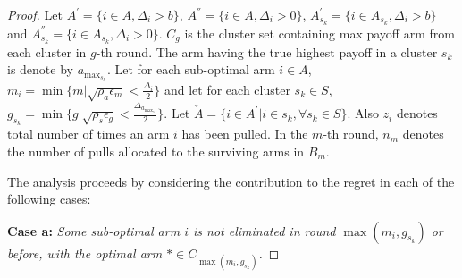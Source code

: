 \begin{proof}

Let $A^{'}=\lbrace i \in A,\Delta_{i}> b\rbrace$,  $A^{''}=\lbrace i \in A, \Delta_{i} > 0\rbrace$, $A^{'}_{s_{k}}=\lbrace i \in A_{s_{k}},\Delta_{i}> b\rbrace$ and $A^{''}_{s_{k}}=\lbrace i \in A_{s_{k}}, \Delta_{i} > 0 \rbrace$. $C_{g}$ is the cluster set containing max payoff arm from each cluster in $g$-th round. The arm having the true highest payoff in a cluster $s_{k}$ is denote by $a_{\max_{s_{k}}}$. Let for each sub-optimal arm ${i}\in A$, $m_{i}=\min{\lbrace m|\sqrt{\rho_{a}\epsilon_{m}} < \frac{\Delta_{i}}{2} \rbrace}$ and let for each cluster $s_{k}\in S$, $g_{s_{k}}=\min{\lbrace g|\sqrt{\rho_{s}\epsilon_{g}} < \frac{\Delta_{a_{\max_{s_{k}}}}}{2} \rbrace}$. 
Let $\check{A}=\lbrace {i}\in A^{'} | {i}\in s_{k} , \forall s_{k}\in S \rbrace$. Also $z_{i}$ denotes total number of times an arm $i$ has been pulled. In the $m$-th round, $n_{m}$ denotes the number of pulls allocated to the surviving arms in $B_{m}$. 

The analysis proceeds by considering the contribution to the regret in each of the following cases:

\textbf{Case a:} \textit{Some sub-optimal arm ${i}$ is not eliminated in round $\max(m_{i},g_{s_{k}})$ or before, with the optimal arm ${*}\in C_{\max(m_{i},g_{s_{k}})}$.}


\end{proof}
